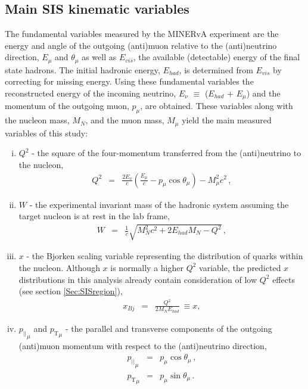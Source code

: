 \documentclass[aps, prd, twocolumn, showpacs, superscriptaddress, floatfix]{revtex4-2}
\begin{document}
\subsection{Main SIS kinematic variables}
The fundamental variables measured by the MINERvA experiment are the energy and angle of the outgoing (anti)muon relative to the (anti)neutrino direction, $E_\mu$ and $\theta_\mu$ as well as $E_{vis}$, the available (detectable) energy of the final state hadrons. The initial hadronic energy, $E_{had}$, is determined from $E_{vis}$ by correcting for missing energy. Using these fundamental variables the reconstructed energy of the incoming neutrino, $E_\nu$ $\equiv$ ($E_{had}$ + $E_\mu$) and the momentum of the outgoing muon, $p_\mu$, are obtained. These variables along with the nucleon mass, $M_N$, and the muon mass, $M_\mu$ yield the main measured variables of this study:
\begin{enumerate}[(i)]
    \item $Q^2$ - the square of the four-momentum transferred from the (anti)neutrino to the nucleon, 
        \begin{eqnarray}
            Q^2 &=& \frac{2E_{\nu}}{c} \left(\frac{E_{\mu}}{c} - p_\mu\cos\theta_\mu \right) - M^2_{\mu}c^2\,,\label{exp_vars1}
        \end{eqnarray}
    \item $W$ - the experimental invariant mass of the hadronic system assuming  the target nucleon is at rest in the lab frame,
        \begin{eqnarray}
            W &=& \frac{1}{c} \sqrt{M_N^2c^2+2E_{had}M_N-Q^{2}}\,,\label{exp_vars2}
        \end{eqnarray}
     \item $x$ - the Bjorken scaling variable representing the distribution of quarks within the nucleon. Although $x$ is normally a higher $Q^2$ variable, the predicted $x$ distributions in this analysis already contain consideration of low $Q^2$ effects (see section \ref{Sec:SISregion}),
        \begin{eqnarray}
            x_{Bj} &=& \frac{Q^2}{2M_N E_{had}}\ \equiv{x},\label{exp_vars5}
        \end{eqnarray}
    \item ${p_{||}}_\mu$ and ${p_\mathrm{T}}_\mu$ - the parallel and transverse components of the outgoing (anti)muon momentum with respect to the (anti)neutrino direction, 
        \begin{eqnarray}
            {{p_{||}}_\mu} &=& p_\mu \cos \theta_\mu\,,\label{exp_vars3}\\ 
            {{p_\mathrm{T}}_\mu} &=& p_\mu \sin \theta_\mu\,.\label{exp_vars4}
        \end{eqnarray}
\end{enumerate}   
\end{document}
